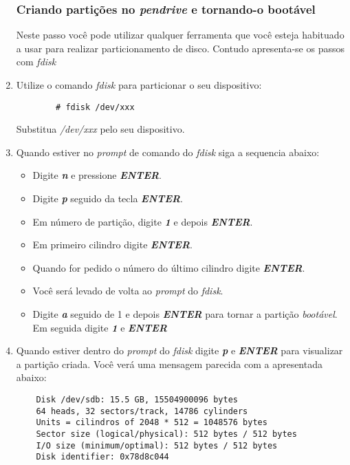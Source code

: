 \documentclass[a4paper,10pt]{article}
\begin{document}
\begin{enumerate}
      \subsubsection{Criando partições no \emph{pendrive} e tornando-o bootável}
      Neste passo você pode utilizar qualquer ferramenta que você esteja habituado a usar para realizar 
      particionamento de disco. Contudo apresenta-se os passos com \emph{fdisk}
	\item Utilize o comando \emph{fdisk} para particionar o seu dispositivo:
	  \begin{lstlisting}
	    # fdisk /dev/xxx
	  \end{lstlisting}
	  Substitua \emph{/dev/xxx} pelo seu dispositivo.
  
    \item Quando estiver no \emph{prompt} de comando do \emph{fdisk} siga a sequencia abaixo:
      \begin{itemize}
	\item Digite \emph{\textbf{n}} e pressione \emph{\textbf{ENTER}}.
	\item Digite \emph{\textbf{p}} seguido da tecla \emph{\textbf{ENTER}}.
	\item Em número de partição, digite \emph{\textbf{1}} e depois \emph{\textbf{ENTER}}.
	\item Em primeiro cilindro digite \emph{\textbf{ENTER}}.
	\item Quando for pedido o número do último cilindro digite \emph{\textbf{ENTER}}.
	\item Você será levado de volta ao \emph{prompt} do \emph{fdisk}.
	\item Digite \emph{\textbf{a}} seguido de 1 e depois \emph{\bf{ENTER}} para tornar a 
	    partição \emph{bootável}. Em seguida digite \emph{\textbf{1}} e \emph{\textbf{ENTER}}
      \end{itemize}

    \item Quando estiver dentro do \emph{prompt} do \emph{fdisk} digite \emph{\textbf{p}} e \emph{\textbf{ENTER}} 
      para visualizar a partição criada. Você verá uma mensagem parecida com a apresentada abaixo:
	\begin{lstlisting}
	Disk /dev/sdb: 15.5 GB, 15504900096 bytes
	64 heads, 32 sectors/track, 14786 cylinders
	Units = cilindros of 2048 * 512 = 1048576 bytes
	Sector size (logical/physical): 512 bytes / 512 bytes
	I/O size (minimum/optimal): 512 bytes / 512 bytes
	Disk identifier: 0x78d8c044


\end{lstlisting}
\end{enumerate}
\end{document}
